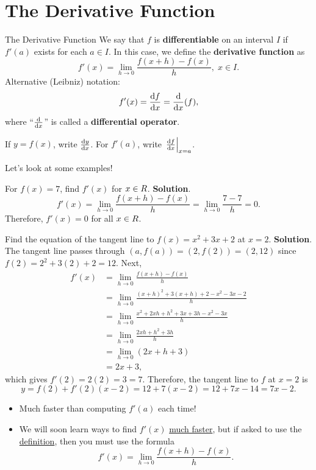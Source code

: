 \section{The Derivative Function}
\begin{Definition}{The Derivative Function}{}
    We say that $ f $ is \textbf{differentiable} on an interval $ I $ if $ f'(a) $ exists
    for each $ a\in I $. In this case, we define the \textbf{derivative function} as
    \[ f'(x)=\lim\limits_{{h} \to {0}}\frac{f(x+h)-f(x)}{h},\; x\in I. \]
    Alternative (Leibniz) notation:
    \[ f'(x)=\odv{f}{x}=\odv*{(f)}{x}, \]
    where ``$\odv{}{x}$'' is called a \textbf{differential operator}.

    If $ y=f(x) $, write $ \odv{y}{x} $. For $ f'(a) $, write $ \odv{f}{x}_{x=a} $.
\end{Definition}
Let's look at some examples!
\begin{Example}{}{}
    For $ f(x)=7 $, find $ f'(x) $ for $ x\in\relax{R} $.
    \tcblower{}
    \textbf{Solution}.
    \[ f'(x)=\lim\limits_{{h} \to {0}}\frac{f(x+h)-f(x)}{h}=\lim\limits_{{h} \to {0}}\frac{7-7}{h}=0. \]
    Therefore, $ f'(x)=0 $ for all $ x\in\relax{R} $.
\end{Example}
\begin{Example}{}{}
    Find the equation of the tangent line to $ f(x)=x^2+3x+2 $ at $ x=2 $.
    \tcblower{}
    \textbf{Solution}. The tangent line passes through $ (a,f(a))=(2,f(2))=(2,12) $ since
    $ f(2)=2^2+3(2)+2=12 $. Next,
    \begin{align*}
        f'(x)
         & =\lim\limits_{{h} \to {0}}\frac{f(x+h)-f(x)}{h}               \\
         & =\lim\limits_{{h} \to {0}}\frac{(x+h)^2+3(x+h)+2-x^2-3x-2}{h} \\
         & =\lim\limits_{{h} \to {0}}\frac{x^2+2xh+h^2+3x+3h-x^2-3x}{h}  \\
         & =\lim\limits_{{h} \to {0}}\frac{2xh+h^2+3h}{h}                \\
         & =\lim\limits_{{h} \to {0}}(2x+h+3)                            \\
         & =2x+3,
    \end{align*}
    which gives $ f'(2)=2(2)=3=7 $. Therefore, the tangent line to $ f $ at $ x=2 $ is
    \[ y=f(2)+f'(2)(x-2)=12+7(x-2)=12+7x-14=7x-2. \]
\end{Example}
\begin{Remark}{}{}
    \begin{itemize}
        \item Much faster than computing $ f'(a) $ each time!
        \item We will soon learn ways to find $ f'(x) $ \underline{much faster}, but if asked to use the
              \underline{definition}, then you must use the formula
              \[ f'(x)=\lim\limits_{{h} \to {0}}\frac{f(x+h)-f(x)}{h}. \]
    \end{itemize}
\end{Remark}
